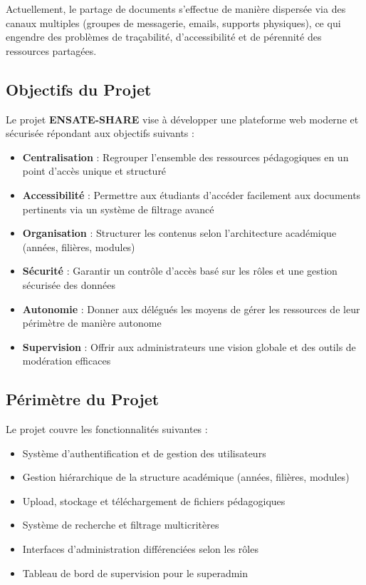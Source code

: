 \documentclass[12pt,a4paper]{article}
\begin{document}
Actuellement, le partage de documents s'effectue de manière dispersée via des canaux multiples (groupes de messagerie, emails, supports physiques), ce qui engendre des problèmes de traçabilité, d'accessibilité et de pérennité des ressources partagées.

\subsection{Objectifs du Projet}

Le projet \textbf{ENSATE-SHARE} vise à développer une plateforme web moderne et sécurisée répondant aux objectifs suivants :

\begin{itemize}[leftmargin=*]
    \item \textbf{Centralisation} : Regrouper l'ensemble des ressources pédagogiques en un point d'accès unique et structuré
    \item \textbf{Accessibilité} : Permettre aux étudiants d'accéder facilement aux documents pertinents via un système de filtrage avancé
    \item \textbf{Organisation} : Structurer les contenus selon l'architecture académique (années, filières, modules)
    \item \textbf{Sécurité} : Garantir un contrôle d'accès basé sur les rôles et une gestion sécurisée des données
    \item \textbf{Autonomie} : Donner aux délégués les moyens de gérer les ressources de leur périmètre de manière autonome
    \item \textbf{Supervision} : Offrir aux administrateurs une vision globale et des outils de modération efficaces
\end{itemize}

\subsection{Périmètre du Projet}

Le projet couvre les fonctionnalités suivantes :
\begin{itemize}[leftmargin=*]
    \item Système d'authentification et de gestion des utilisateurs
    \item Gestion hiérarchique de la structure académique (années, filières, modules)
    \item Upload, stockage et téléchargement de fichiers pédagogiques
    \item Système de recherche et filtrage multicritères
    \item Interfaces d'administration différenciées selon les rôles
    \item Tableau de bord de supervision pour le superadmin
\end{itemize}
\end{document}
